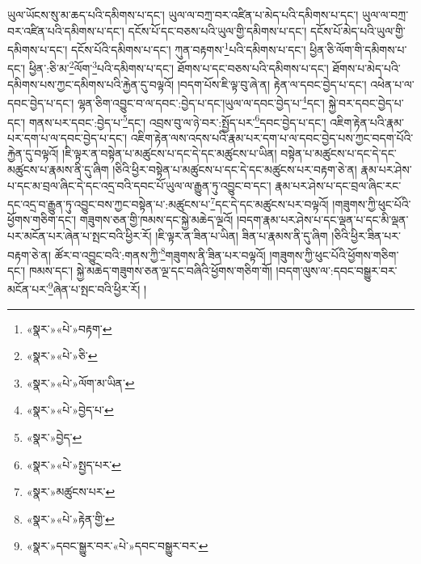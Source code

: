 ཡུལ་ཡོངས་སུ་མ་ཆད་པའི་དམིགས་པ་དང་། ཡུལ་ལ་བཀྲ་བར་འཛིན་པ་མེད་པའི་དམིགས་པ་དང་། ཡུལ་ལ་བཀྲ་བར་འཛིན་པའི་དམིགས་པ་དང་། དངོས་པོ་དང་བཅས་པའི་ཡུལ་གྱི་དམིགས་པ་དང་། དངོས་པོ་མེད་པའི་ཡུལ་གྱི་དམིགས་པ་དང་། དངོས་པོའི་དམིགས་པ་དང་། ཀུན་བརྟགས་\footnote{«སྣར་»«པེ་»བརྟག་}པའི་དམིགས་པ་དང་། ཕྱིན་ཅི་ལོག་གི་དམིགས་པ་དང་། ཕྱིན་:ཅི་མ་\footnote{«སྣར་»«པེ་»ཅི་}ལོག་\footnote{«སྣར་»«པེ་»ལོག་མ་ཡིན་}པའི་དམིགས་པ་དང་། ཐོགས་པ་དང་བཅས་པའི་དམིགས་པ་དང་། ཐོགས་པ་མེད་པའི་དམིགས་པས་ཀྱང་དམིགས་པའི་རྐྱེན་དུ་བལྟའོ། །བདག་པོས་ཇི་ལྟ་བུ་ཞེ་ན། རྟེན་ལ་དབང་བྱེད་པ་དང་། འཕེན་པ་ལ་དབང་བྱེད་པ་དང་། ལྷན་ཅིག་འབྱུང་བ་ལ་དབང་:བྱེད་པ་དང་།ཡུལ་ལ་དབང་བྱེད་པ་\footnote{«སྣར་»«པེ་»བྱེད་པ་}དང་། སྐྱེ་བར་དབང་བྱེད་པ་དང་། གནས་པར་དབང་:བྱེད་པ་\footnote{«སྣར་»བྱེད་}དང་། འབྲས་བུ་ལ་ཉེ་བར་:སྤྱོད་པར་\footnote{«སྣར་»«པེ་»སྤྱད་པར་}དབང་བྱེད་པ་དང་། འཇིག་རྟེན་པའི་རྣམ་པར་དག་པ་ལ་དབང་བྱེད་པ་དང་། འཇིག་རྟེན་ལས་འདས་པའི་རྣམ་པར་དག་པ་ལ་དབང་བྱེད་པས་ཀྱང་བདག་པོའི་རྐྱེན་དུ་བལྟའོ། །ཇི་ལྟར་ན་བསྟེན་པ་མཚུངས་པ་དང་དེ་དང་མཚུངས་པ་ཡིན། བསྟེན་པ་མཚུངས་པ་དང་དེ་དང་མཚུངས་པ་རྣམས་ནི་དུ་ཞིག །ཅིའི་ཕྱིར་བསྟེན་པ་མཚུངས་པ་དང་དེ་དང་མཚུངས་པར་བརྟག་ཅེ་ན། རྣམ་པར་ཤེས་པ་དང་མ་བྲལ་ཞིང་དེ་དང་འདྲ་བའི་དབང་པོ་ཡུལ་ལ་རྒྱུན་ཏུ་འབྱུང་བ་དང་། རྣམ་པར་ཤེས་པ་དང་བྲལ་ཞིང་རང་དང་འདྲ་བ་རྒྱུན་ཏུ་འབྱུང་བས་ཀྱང་བསྟེན་པ་:མཚུངས་པ་\footnote{«སྣར་»མཚུངས་པར་}དང་དེ་དང་མཚུངས་པར་བལྟའོ། །གཟུགས་ཀྱི་ཕུང་པོའི་ཕྱོགས་གཅིག་དང་། གཟུགས་ཅན་གྱི་ཁམས་དང་སྐྱེ་མཆེད་ལྔའོ། །བདག་རྣམ་པར་ཤེས་པ་དང་ལྡན་པ་དང་མི་ལྡན་པར་མངོན་པར་ཞེན་པ་སྤང་བའི་ཕྱིར་རོ། །ཇི་ལྟར་ན་ཟིན་པ་ཡིན། ཟིན་པ་རྣམས་ནི་དུ་ཞིག །ཅིའི་ཕྱིར་ཟིན་པར་བརྟག་ཅེ་ན། ཚོར་བ་འབྱུང་བའི་:གནས་ཀྱི་\footnote{«སྣར་»«པེ་»རྟེན་གྱི་}གཟུགས་ནི་ཟིན་པར་བལྟའོ། །གཟུགས་ཀྱི་ཕུང་པོའི་ཕྱོགས་གཅིག་དང་། ཁམས་དང་། སྐྱེ་མཆེད་གཟུགས་ཅན་ལྔ་དང་བཞིའི་ཕྱོགས་གཅིག་གོ། །བདག་ལུས་ལ་:དབང་བསྒྱུར་བར་མངོན་པར་\footnote{«སྣར་»དབང་སྒྱུར་བར་«པེ་»དབང་བསྒྱུར་བར་}ཞེན་པ་སྤང་བའི་ཕྱིར་རོ། །

